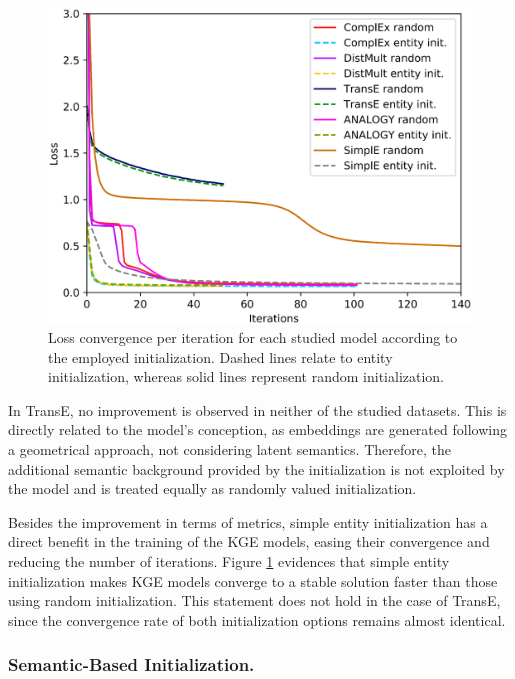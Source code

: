 \begin{figure}[t]
    \centering
    \includegraphics[width=.8\linewidth]{4_kbsintegrationdl/figures/ConvergenceDetail.eps}
    \caption{Loss convergence per iteration for each studied model according to the employed initialization. Dashed lines relate to entity initialization, whereas solid lines represent random initialization.}
    \label{fig:convergence}
\end{figure}


In TransE, no improvement is observed in neither of the studied datasets. This is directly related to the model's conception, as embeddings are generated following a geometrical approach, not considering latent semantics. Therefore, the additional semantic background provided by the initialization is not exploited by the model and is treated equally as randomly valued initialization.

Besides the improvement in terms of metrics, simple entity initialization has a direct benefit in the training of the KGE models, easing their convergence and reducing the number of iterations. Figure \ref{fig:convergence} evidences that simple entity initialization makes KGE models converge to a stable solution faster than those using random initialization. This statement does not hold in the case of TransE, since the convergence rate of both initialization options remains almost identical.

\subsubsection{Semantic-Based Initialization.}

